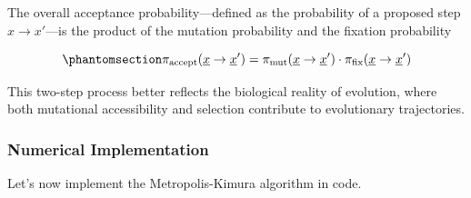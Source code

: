 \documentclass[
]{scrartcl}
\begin{document}
The overall acceptance probability---defined as the probability of a
proposed step \(x \rightarrow x'\)---is the product of the mutation
probability and the fixation probability

\begin{equation}\phantomsection\label{eq-overall-acceptance-probability}{
\pi_{\text{accept}}(\underline{x} \to \underline{x}') = 
\pi_{\text{mut}}(\underline{x} \to \underline{x}') \cdot 
\pi_{\text{fix}}(\underline{x} \to \underline{x}')
}\end{equation}

This two-step process better reflects the biological reality of
evolution, where both mutational accessibility and selection contribute
to evolutionary trajectories.

\subsubsection{Numerical Implementation}\label{numerical-implementation}

Let's now implement the Metropolis-Kimura algorithm in code.
\end{document}
